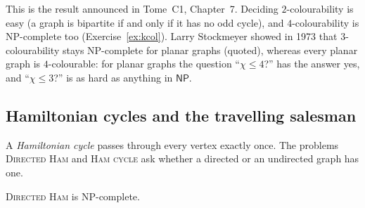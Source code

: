 This is the result announced in Tome~C1, Chapter~7. Deciding $2$-colourability is easy (a graph is bipartite if and only if it has no odd cycle), and $4$-colourability is NP-complete too (Exercise~\ref{ex:kcol}). Larry Stockmeyer showed in 1973 that $3$-colourability stays NP-complete for planar graphs (quoted), whereas every planar graph is $4$-colourable: for planar graphs the question ``$\chi\le4$?'' has the answer yes, and ``$\chi\le3$?'' is as hard as anything in $\mathsf{NP}$.

\subsection*{Hamiltonian cycles and the travelling salesman}

A \emph{Hamiltonian cycle} passes through every vertex exactly once. The problems \textup{\textsc{Directed Ham}} and \textup{\textsc{Ham cycle}} ask whether a directed or an undirected graph has one.

\begin{theorem}\label{thm:dham}
\textup{\textsc{Directed Ham}} is NP-complete.
\end{theorem}

